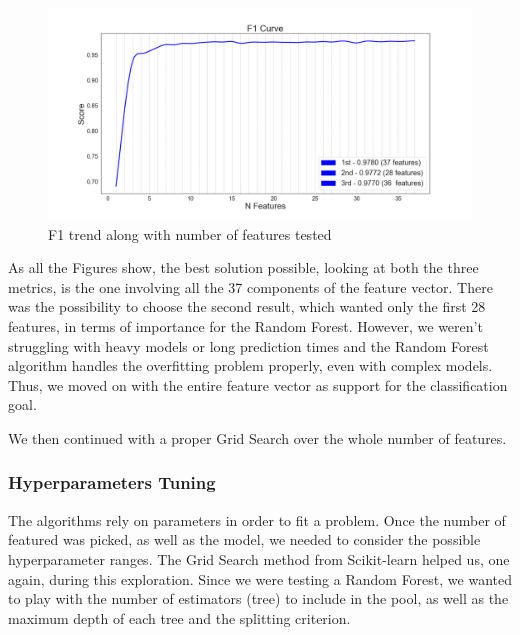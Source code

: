 \begin{figure}[htp!]
	\centering
	\includegraphics[width=\columnwidth]{chapter5/figure/f1_along_features.png}
	\caption{F1 trend along with number of features tested}
	\label{fig:feat_f1}
\end{figure}

As all the Figures show, the best solution possible, looking at both the three metrics, is the one involving all the 37 components of the feature vector.
There was the possibility to choose the second result, which wanted only the first 28 features, in terms of importance for the Random Forest. However, we weren't struggling with heavy models or long prediction times and the Random Forest algorithm handles the overfitting problem properly, even with complex models.
Thus, we moved on with the entire feature vector as support for the classification goal.

We then continued with a proper Grid Search over the whole number of features.
\subsubsection{Hyperparameters Tuning}
The algorithms rely on parameters in order to fit a problem.
Once the number of featured was picked, as well as the model, we needed to consider the possible hyperparameter ranges. 
The Grid Search method from Scikit-learn helped us, one again, during this exploration.
Since we were testing a Random Forest, we wanted to play with the number of estimators (tree) to include in the pool, as well as the maximum depth of each tree and the splitting criterion.

